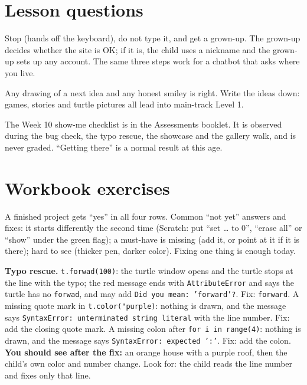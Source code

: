 
\section{Lesson questions}
\begin{answer}
Stop (hands off the keyboard), do not type it, and get a grown-up. The grown-up decides whether the site is OK; if it is, the child uses a nickname and the grown-up sets up any account. The same three steps work for a chatbot that asks where you live.
\end{answer}

\begin{answer}[Reflection]
Any drawing of a next idea and any honest smiley is right. Write the ideas down: games, stories and turtle pictures all lead into main-track Level 1.
\end{answer}

\begin{answer}
The Week 10 show-me checklist is in the Assessments booklet. It is observed during the bug check, the typo rescue, the showcase and the gallery walk, and is never graded. \enquote{Getting there} is a normal result at this age.
\end{answer}

\section{Workbook exercises}
\begin{answer}
A finished project gets \enquote{yes} in all four rows. Common \enquote{not yet} answers and fixes: it starts differently the second time (Scratch: put \enquote{set \ldots{} to 0}, \enquote{erase all} or \enquote{show} under the green flag); a must-have is missing (add it, or point at it if it is there); hard to see (thicker pen, darker color). Fixing one thing is enough today.

\textbf{Typo rescue.} \texttt{t.forwad(100)}: the turtle window opens and the turtle stops at the line with the typo; the red message ends with \texttt{AttributeError} and says the turtle has no \texttt{forwad}, and may add \texttt{Did you mean: 'forward'?}. Fix: \texttt{forward}. A missing quote mark in \texttt{t.color("purple)}: nothing is drawn, and the message says \texttt{SyntaxError: unterminated string literal} with the line number. Fix: add the closing quote mark. A missing colon after \texttt{for i in range(4)}: nothing is drawn, and the message says \texttt{SyntaxError: expected ':'}. Fix: add the colon. \textbf{You should see after the fix:} an orange house with a purple roof, then the child's own color and number change. Look for: the child reads the line number and fixes only that line.
\end{answer}

